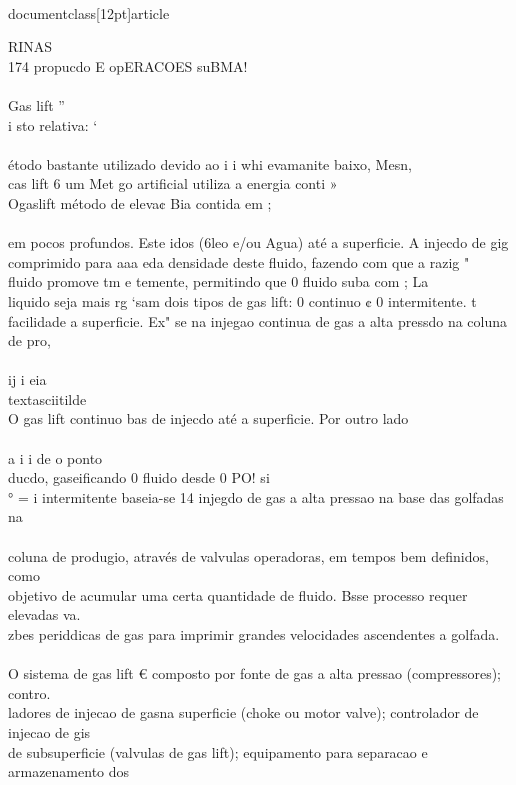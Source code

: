 \\documentclass[12pt]{article}
\begin{document}
RINAS\\
174 propucdo E opERACOES suBMA!\\
\\
Gas lift ”\\
i sto relativa: ‘\\
\\
étodo bastante utilizado devido ao i i whi evamanite baixo, Mesn,\\
cas lift 6 um Met go artificial utiliza a energia conti »\\
Ogaslift método de eleva¢ Bia contida em ;\\
\\
em pocos profundos. Este idos (6leo e/ou Agua) até a superficie. A injecdo de gig\\
comprimido para aaa eda densidade deste fluido, fazendo com que a razig "\\
fluido promove tm e temente, permitindo que 0 fluido suba com ; La\\
liquido seja mais rg ‘sam dois tipos de gas lift: 0 continuo ¢ 0 intermitente. t\\
facilidade a superficie. Ex" se na injegao continua de gas a alta pressdo na coluna de pro,\\
\\
ij i eia\\textasciitilde{}\\
O gas lift continuo bas de injecdo até a superficie. Por outro lado\\
\\
a i i de o ponto\\
ducdo, gaseificando 0 fluido desde 0 PO! si\\
° = i intermitente baseia-se 14 injegdo de gas a alta pressao na base das golfadas na\\
\\
coluna de produgio, através de valvulas operadoras, em tempos bem definidos, como\\
objetivo de acumular uma certa quantidade de fluido. Bsse processo requer elevadas va.\\
zbes periddicas de gas para imprimir grandes velocidades ascendentes a golfada.\\
\\
O sistema de gas lift € composto por fonte de gas a alta pressao (compressores); contro.\\
ladores de injecao de gasna superficie (choke ou motor valve); controlador de injecao de gis\\
de subsuperficie (valvulas de gas lift); equipamento para separacao e armazenamento dos\\
\end{document}
